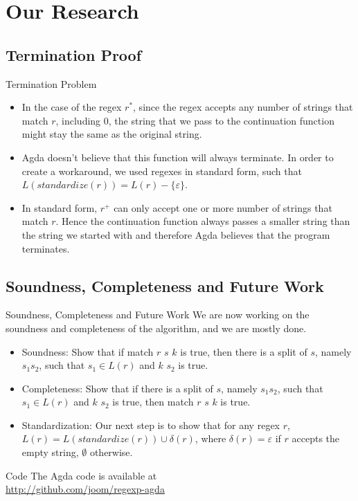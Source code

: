 \documentclass{beamer}
\begin{document}
\section{Our Research}

\subsection{Termination Proof}

\begin{frame}{Termination Problem}
\begin{itemize}
\item  In the case of the regex $r^*$, since the regex accepts any number of strings that match $r$, including $0$, the string that we pass to the continuation function might stay the same as the original string.
\item Agda doesn't believe that this function will always terminate. In order to create a workaround, we used regexes in standard form, such that $L(standardize(r)) = L(r) - \{\varepsilon\}$.
\item In standard form, $r^+$ can only accept one or more number of strings that match $r$. Hence the continuation function always passes a smaller string than the string we started with and therefore Agda believes that the program terminates.
\end{itemize}
\end{frame}

\subsection{Soundness, Completeness and Future Work}

\begin{frame}{Soundness, Completeness and Future Work}
We are now working on the soundness and completeness of the algorithm, and we are mostly done.
\begin{itemize}
\item Soundness: Show that if match $r$ $s$ $k$ is true, then there is a split of $s$, namely $s_1 s_2$, such that $s_1 \in L(r)$ and $k$ $s_2$ is true.
\item Completeness: Show that if there is a split of $s$, namely $s_1 s_2$, such that $s_1 \in L(r)$ and $k$ $s_2$ is true, then match $r$ $s$ $k$ is true.
\item Standardization: Our next step is to show that for any regex $r$, $L(r) = L(standardize(r)) \cup \delta(r)$, where $\delta(r) = \varepsilon$ if $r$ accepts the empty string, $\emptyset$ otherwise.
\end{itemize}
\end{frame}

\begin{frame}{Code}
The Agda code is available at\\
\url{http://github.com/joom/regexp-agda}
\end{frame}
\end{document}
